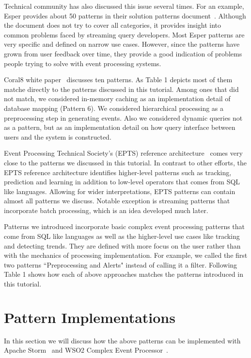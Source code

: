 \documentclass{sig-alternate}
\begin{document}
{Technical community has also discussed this issue several times. For an example, Esper provides about 50 patterns in their solution patterns document~\cite{esperPatterns}. Although the document does not try to cover all categories, it provides insight into common problems faced by streaming query developers. Most Esper patterns are very specific and defined on narrow use cases. However, since the patterns have grown from user feedback over time, they provide a good indication of problems people trying to solve with event processing systems. 

Coral8 white paper~\cite{Coral810patterns} discusses ten patterns. As Table 1 depicts most of them matche directly to the patterns discussed in this tutorial. Among ones that did not match, we considered in-memory caching as an implementation detail of database mapping (Pattern 6). We considered hierarchical processing as a preprocessing step in generating events. Also we considered dynamic queries not as a pattern, but as an implementation detail on how query interface between users and the system is constructed. 

Event Processing Technical Society's (EPTS) reference architecture~\cite{eptsRefArch} comes very close to the patterns we discussed in this tutorial. In contrast to other efforts, the EPTS reference architecture identifies higher-level patterns such as tracking, prediction and learning in addition to low-level operators that comes from SQL like languages. Allowing for wider interpretations, EPTS patterns can contain almost all patterns we discuss. Notable exception is streaming patterns that incorporate batch processing, which is an idea developed much later. 

Patterns we introduced incorporate basic complex event processing patterns that come from SQL like languages as well as the higher-level use cases like tracking and detecting trends.  They are defined with more focus on the user rather than with the mechanics of processing implementation. For example, we called the first two patterns ``Preprocessing and Alerts" instead of calling it a filter. Following Table 1 shows how each of above approaches matches the patterns introduced in this tutorial. 

\section{Pattern Implementations}  

In this section we will discuss how the above patterns can be implemented with Apache Storm~\cite{storm} and WSO2 Complex Event Processor~\cite{siddhi}. 

}
\end{document}
